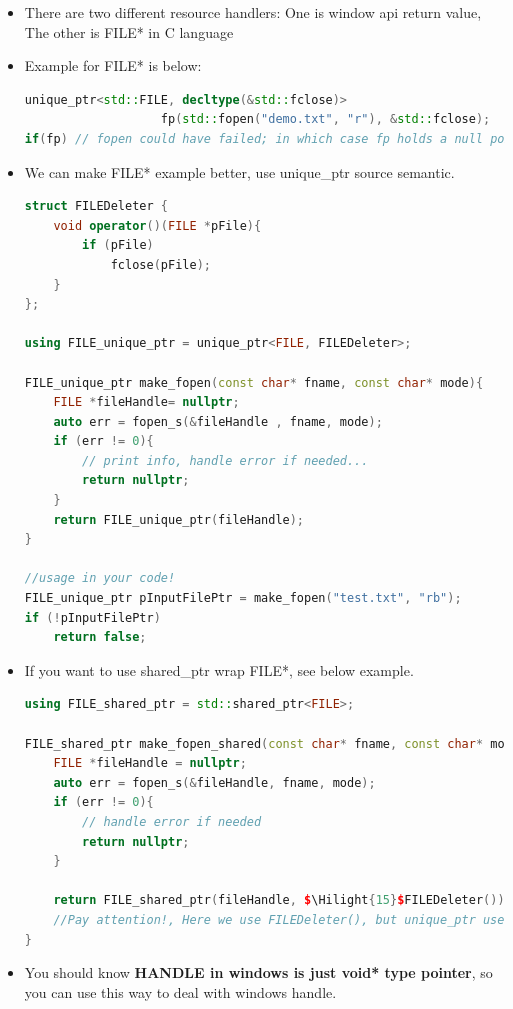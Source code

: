 \documentclass[a4paper,12pt,twoside]{book}
\newcommand{\Hilight}[1]{\makebox[0pt][l]{\color{yellow}\rule[-3pt]{#1em}{11pt}}}
\begin{document}
\begin{itemize}
\item There are two different resource handlers: One is window api return value, The other is FILE* in C language

\item Example for FILE* is below:

\begin{lstlisting}[frame=single, language=c++]
unique_ptr<std::FILE, decltype(&std::fclose)> 
                   fp(std::fopen("demo.txt", "r"), &std::fclose);
if(fp) // fopen could have failed; in which case fp holds a null pointer
\end{lstlisting}

\item We can make FILE* example better, use unique\_ptr source semantic.
\begin{lstlisting}[frame=single, language=c++]
struct FILEDeleter {
    void operator()(FILE *pFile){
        if (pFile)
            fclose(pFile);
    }
};

using FILE_unique_ptr = unique_ptr<FILE, FILEDeleter>;

FILE_unique_ptr make_fopen(const char* fname, const char* mode){
    FILE *fileHandle= nullptr;
    auto err = fopen_s(&fileHandle , fname, mode); 
    if (err != 0){
        // print info, handle error if needed...
        return nullptr;
    }
    return FILE_unique_ptr(fileHandle);
}

//usage in your code!
FILE_unique_ptr pInputFilePtr = make_fopen("test.txt", "rb");
if (!pInputFilePtr)
    return false;
\end{lstlisting}

\item If you want to use shared\_ptr wrap FILE*, see below example.
\begin{lstlisting}[frame=single, language=c++]
using FILE_shared_ptr = std::shared_ptr<FILE>;

FILE_shared_ptr make_fopen_shared(const char* fname, const char* mode){
    FILE *fileHandle = nullptr;
    auto err = fopen_s(&fileHandle, fname, mode);
    if (err != 0){
        // handle error if needed
        return nullptr;
    }

    return FILE_shared_ptr(fileHandle, $\Hilight{15}$FILEDeleter());
    //Pay attention!, Here we use FILEDeleter(), but unique_ptr use FILEDeleter
}
\end{lstlisting}

\item You should know \textbf{HANDLE in windows is just void* type pointer}, so you can use this way to deal with windows handle.


\end{itemize}
\end{document}
